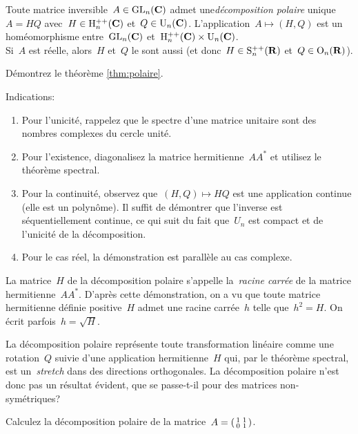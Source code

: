 \begin{theorem}
	\label{thm:polaire}
	Toute matrice inversible~$A\in\mathrm{GL}_n(\mathbf{C})$ admet une\emph{décomposition
	polaire}
	unique~$A=HQ$ avec~$H\in\mathrm{H}_n^{++}(\mathbf{C})$ et~$Q\in\mathrm{U}_n(\mathbf{C})$.
	L'application~$A\mapsto(H,Q)$ est un homéomorphisme entre~$\mathrm{GL}_n(\mathbf{C})$
	et~$\mathrm{H}_n^{++}(\mathbf{C})\times\mathrm{U}_n(\mathbf{C})$.\\
	Si~$A$ est réelle, alors~$H$ et~$Q$ le sont
	aussi (et donc~$H\in\mathrm{S}^{++}_n(\mathbf{R})$ et~$Q\in\mathrm{O}_n(\mathbf{R})$).
\end{theorem}

\begin{exercice}
	Démontrez le théorème \ref{thm:polaire}.
\end{exercice}
\vspace{-1em}
Indications:
\begin{enumerate}
	\item Pour l'unicité, rappelez que le spectre d'une matrice
		unitaire sont des nombres complexes du cercle unité.
	\item Pour l'existence, diagonalisez la matrice hermitienne~$AA^*$ et
		utilisez le théorème spectral.
	\item Pour la continuité, observez que~$(H,Q)\mapsto HQ$ est une
		application continue (elle est un polynôme).  Il suffit de démontrer
		que l'inverse est séquentiellement continue, ce qui suit du fait
		que~$U_n$ est compact et de l'unicité de la décomposition.
	\item Pour le cas réel, la démonstration est parallèle au cas complexe.
\end{enumerate}

La matrice~$H$ de la décomposition polaire s'appelle la~\emph{racine carrée}
de la matrice hermitienne~$AA^*$.  D'après cette démonstration, on a vu que
toute matrice hermitienne définie positive~$H$ admet une racine carrée~$h$
telle que~$h^2=H$.  On écrit parfois~$h=\sqrt H$.

La décomposition polaire représente toute transformation linéaire comme une
rotation~$Q$ suivie d'une application hermitienne~$H$ qui, par le théorème
spectral, est un~\emph{stretch} dans des directions orthogonales.  La
décomposition polaire n'est donc pas un résultat évident, que se passe-t-il
pour des matrices non-symétriques?

\begin{exercice}[difficile]
	Calculez la décomposition polaire de la
	matrice~$A=\left(\begin{smallmatrix}1&1\\0&1\end{smallmatrix}\right)$.
\end{exercice}

